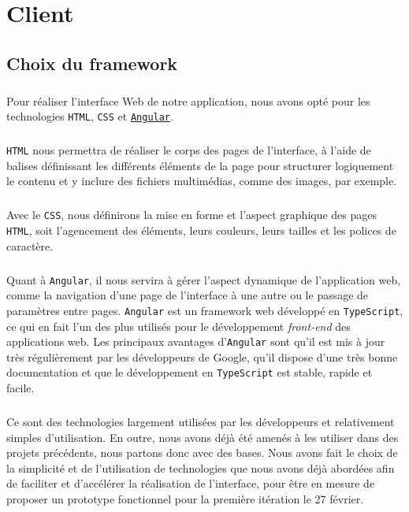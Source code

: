 \chapter{Client}

\section{Choix du framework}

\paragraph{}
Pour réaliser l’interface Web de notre application, nous avons opté pour les technologies \texttt{HTML}, \texttt{CSS} et \href{https://angular.io/}{\texttt{Angular}}.

\paragraph{}
\texttt{HTML} nous permettra de réaliser le corps des pages de l’interface, à l’aide de balises définissant les différents éléments de la page pour structurer logiquement le contenu et y inclure des fichiers multimédias, comme des images, par exemple.

\paragraph{}
Avec le \texttt{CSS}, nous définirons la mise en forme et l’aspect graphique des pages \texttt{HTML}, soit l’agencement des éléments, leurs couleurs, leurs tailles et les polices de caractère.

\paragraph{}
Quant à \texttt{Angular}, il nous servira à gérer l’aspect dynamique de l’application web, comme la navigation d’une page de l’interface à une autre ou le passage de paramètres entre pages. \texttt{Angular} est un framework web développé en \texttt{TypeScript}, ce qui en fait l’un des plus utilisés pour le développement \textit{front-end} des applications web. Les principaux avantages d’\texttt{Angular} sont qu’il est mis à jour très régulièrement par les développeurs de Google, qu’il dispose d’une très bonne documentation et que le développement en \texttt{TypeScript} est stable, rapide et facile.

\paragraph{}
Ce sont des technologies largement utilisées par les développeurs et relativement simples d’utilisation. En outre, nous avons déjà été amenés à les utiliser dans des projets précédents, nous partons donc avec des bases. Nous avons fait le choix de la simplicité et de l’utilisation de technologies que nous avons déjà abordées afin de faciliter et d’accélérer la réalisation de l’interface, pour être en mesure de proposer un prototype fonctionnel pour la première itération le 27 février.

